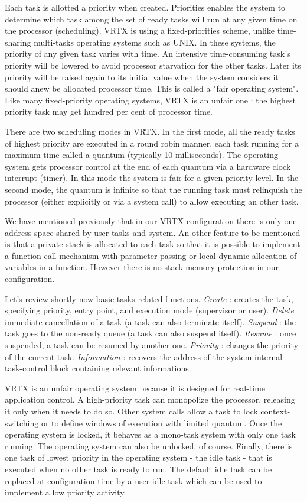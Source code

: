 \documentclass[10pt]{report}
\begin{document}
Each task is allotted a priority when created. Priorities enables
the system to determine which task among the set of ready tasks
will run at any given time on the processor (scheduling). VRTX is
using a fixed-priorities scheme, unlike time-sharing multi-tasks
operating systems such as UNIX. In these systems, the priority of
any given task varies with time. An intensive time-consuming
task's priority will be lowered to avoid processor starvation for
the other tasks. Later its priority will be raised again to its
initial value when the system considers it should anew be
allocated processor time. This is called a "fair operating system".
Like many fixed-priority operating systems, VRTX is an unfair
one : the highest priority task may get hundred per cent of
processor time.

There are two scheduling modes in VRTX. In the first mode, all
the ready tasks of highest priority are executed in a round robin
manner, each task running for a maximum time called a quantum
(typically 10 milliseconds). The operating system gets processor
control at the end of each quantum via a hardware clock interrupt
(timer). In this mode the system is fair for a given priority
level. In the second mode, the quantum is infinite so that the
running task must relinquish the processor (either explicitly or
via a system call) to allow executing an other task.

We have mentioned previously that in our VRTX configuration there
is only one address space shared by user tasks and system. An
other feature to be mentioned is that a private stack is
allocated to each task so that it is possible to implement a
function-call mechanism with parameter passing or local dynamic
allocation of variables in a function. However there is no
stack-memory protection in our configuration.

Let's review shortly now basic tasks-related functions. {\em Create} : creates the task, specifying priority, entry point,
and execution mode (supervisor or user). {\em Delete} : immediate cancellation of a
task (a task can also terminate itself). {\em Suspend} : the task goes
to the non-ready queue (a task can also suspend itself). {\em Resume} : once suspended, a task
can be resumed by another one. {\em Priority} : changes the priority of the current task. {\em Information} : recovers
the address of the system internal task-control block containing relevant informations.

VRTX is an unfair operating system because it is designed for
real-time application control. A high-priority task can
monopolize the processor, releasing it only when it needs to do
so. Other system calls allow a task to lock context-switching or
to define windows of execution with limited quantum. Once the
operating system is locked, it behaves as a mono-task system with
only one task running. The operating system can also be unlocked,
of course. Finally, there is one task of lowest priority in the
operating system - the idle task - that is executed when no other
task is ready to run. The default idle task can be replaced at
configuration time by a user idle task which can be used to
implement a low priority activity.
\end{document}
